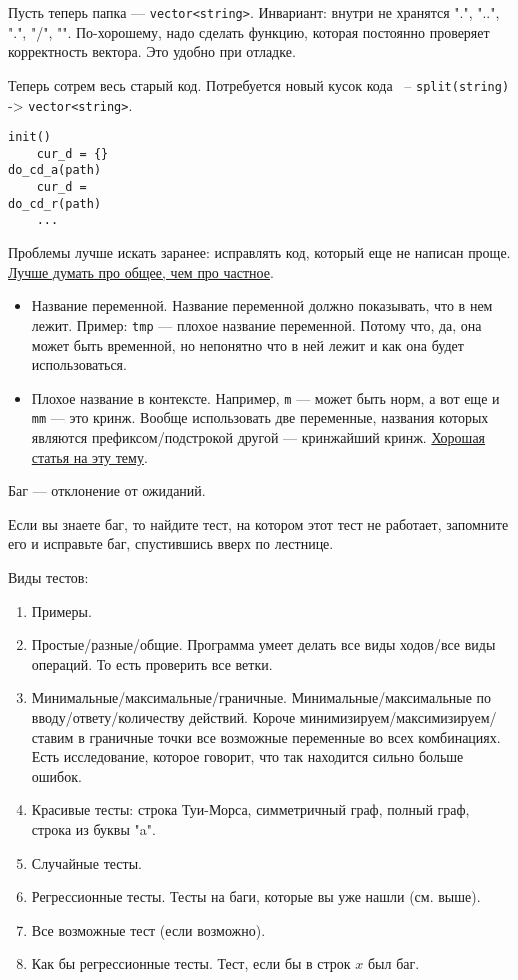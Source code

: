Пусть теперь папка --- \texttt{vector<string>}. Инвариант: внутри не хранятся ".", "..", ".", "/", "". По-хорошему, надо сделать функцию, которая постоянно проверяет корректность вектора. Это удобно при отладке.

Теперь сотрем весь старый код. Потребуется новый кусок кода ~-- \texttt{split(string)} -> \texttt{vector<string>}.

\begin{lstlisting}
init()
    cur_d = {}
do_cd_a(path)
    cur_d = 
do_cd_r(path)
    ...
\end{lstlisting}

Проблемы лучше искать заранее: исправлять код, который еще не написан проще. \href{http://blog.algoprog.ru/special-cases/}{Лучше думать про общее, чем про частное}.


\begin{itemize}
    \item Название переменной. Название переменной должно показывать, что в нем лежит. Пример: \texttt{tmp} --- плохое название переменной. Потому что, да, она может быть временной, но непонятно что в ней лежит и как она будет использоваться.
    \item Плохое название в контексте. Например, \texttt{m} --- может быть норм, а вот еще и \texttt{mm} --- это кринж. Вообще использовать две переменные, названия которых являются префиксом/подстрокой другой --- кринжайший кринж. \href{http://blog.algoprog.ru/init-not-clear}{Хорошая статья на эту тему}.
\end{itemize}


Баг --- отклонение от ожиданий.

Если вы знаете баг, то найдите тест, на котором этот тест не работает, запомните его и исправьте баг, спустившись вверх по лестнице. 

Виды тестов:
\begin{enumerate}
    \item Примеры. 
    \item Простые/разные/общие. Программа умеет делать все виды ходов/все виды операций. То есть проверить все ветки.
    \item Минимальные/максимальные/граничные. Минимальные/максимальные по вводу/ответу/количеству действий. Короче минимизируем/максимизируем/ставим в граничные точки все возможные переменные во всех комбинациях. Есть исследование, которое говорит, что так находится сильно больше ошибок.
    \item Красивые тесты: строка Туи-Морса, симметричный граф, полный граф, строка из буквы "a".
    \item Случайные тесты.
    \item Регрессионные тесты. Тесты на баги, которые вы уже нашли (см. выше).
    \item Все возможные тест (если возможно).
    \item Как бы регрессионные тесты. Тест, если бы в строк $x$ был баг. 
\end{enumerate}

